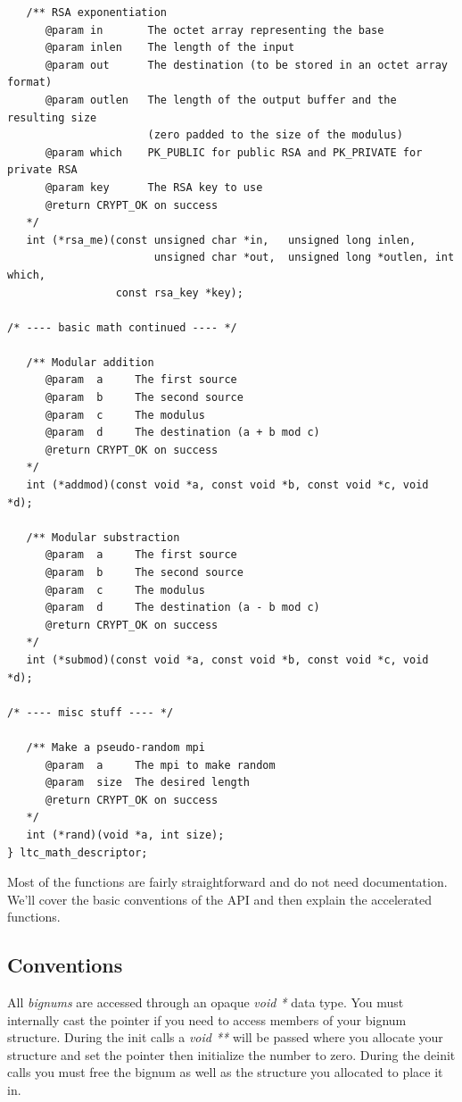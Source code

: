 \documentclass[synpaper]{book}
\begin{document}
\begin{small}
\begin{verbatim}
   /** RSA exponentiation
      @param in       The octet array representing the base
      @param inlen    The length of the input
      @param out      The destination (to be stored in an octet array format)
      @param outlen   The length of the output buffer and the resulting size
                      (zero padded to the size of the modulus)
      @param which    PK_PUBLIC for public RSA and PK_PRIVATE for private RSA
      @param key      The RSA key to use
      @return CRYPT_OK on success
   */
   int (*rsa_me)(const unsigned char *in,   unsigned long inlen,
                       unsigned char *out,  unsigned long *outlen, int which,
                 const rsa_key *key);

/* ---- basic math continued ---- */

   /** Modular addition
      @param  a     The first source
      @param  b     The second source
      @param  c     The modulus
      @param  d     The destination (a + b mod c)
      @return CRYPT_OK on success
   */
   int (*addmod)(const void *a, const void *b, const void *c, void *d);

   /** Modular substraction
      @param  a     The first source
      @param  b     The second source
      @param  c     The modulus
      @param  d     The destination (a - b mod c)
      @return CRYPT_OK on success
   */
   int (*submod)(const void *a, const void *b, const void *c, void *d);

/* ---- misc stuff ---- */

   /** Make a pseudo-random mpi
      @param  a     The mpi to make random
      @param  size  The desired length
      @return CRYPT_OK on success
   */
   int (*rand)(void *a, int size);
} ltc_math_descriptor;
\end{verbatim}
\end{small}

Most of the functions are fairly straightforward and do not need documentation.  We'll cover the basic conventions of the API and then explain the accelerated functions.

\subsection{Conventions}

All \textit{bignums} are accessed through an opaque \textit{void *} data type.  You must internally cast the pointer if you need to access members of your bignum structure.  During
the init calls a \textit{void **} will be passed where you allocate your structure and set the pointer then initialize the number to zero.  During the deinit calls you must
free the bignum as well as the structure you allocated to place it in.
\end{document}
